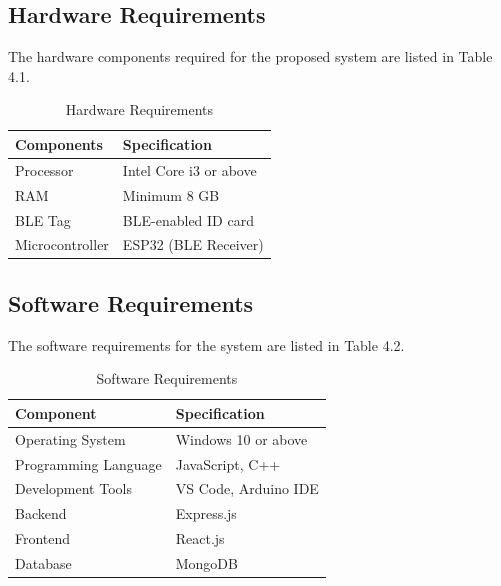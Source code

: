 \subsection{Hardware Requirements}
The hardware components required for the proposed system are listed in Table 4.1. 

\begin{table}[h]
\centering
\caption{Hardware Requirements}
\begin{tabular}{ll}
\toprule
Components & Specification \\ \midrule
Processor & Intel Core i3 or above \\
RAM & Minimum 8 GB \\
BLE Tag & BLE-enabled ID card \\
Microcontroller & ESP32 (BLE Receiver) \\
\bottomrule
\end{tabular}
\end{table}

\subsection{Software Requirements}
The software requirements for the system are listed in Table 4.2. 

\begin{table}[h]
\centering
\caption{Software Requirements}
\begin{tabular}{ll}
\toprule
Component & Specification \\ \midrule
Operating System & Windows 10 or above \\
Programming Language & JavaScript, C++ \\
Development Tools & VS Code, Arduino IDE \\
Backend & Express.js \\
Frontend & React.js \\
Database & MongoDB \\
\bottomrule
\end{tabular}
\end{table}
